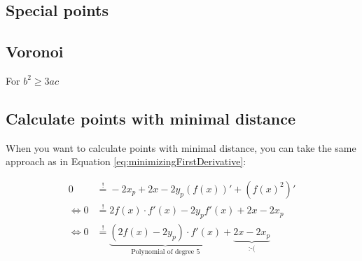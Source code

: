 \documentclass[a4paper]{scrartcl}
\theoremstyle{break}
\theoremstyle{nonumberplain}
\begin{document}

\subsection{Special points}

\subsection{Voronoi}

For $b^2 \geq 3ac$

\subsection{Calculate points with minimal distance}
When you want to calculate points with minimal distance, you can 
take the same approach as in Equation \ref{eq:minimizingFirstDerivative}:

\begin{align}
    0  &\stackrel{!}{=} -2 x_p + 2x -2y_p(f(x))' + (f(x)^2)'\\
    \Leftrightarrow 0 &\stackrel{!}{=} 2 f(x) \cdot f'(x) - 2 y_p f'(x) + 2x - 2 x_p\\
    \Leftrightarrow 0 &\stackrel{!}{=} \underbrace{\left (2 f(x) - 2 y_p \right ) \cdot f'(x)}_{\text{Polynomial of degree 5}} + \underbrace{2x - 2 x_p}_{\text{:-(}}
\end{align}



\end{document}
